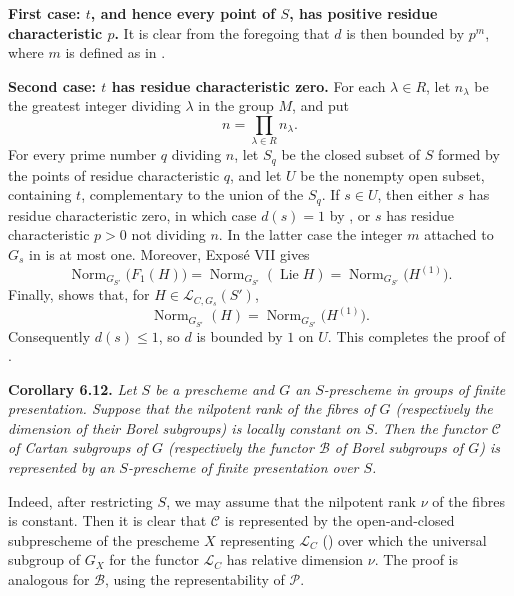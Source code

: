 \textbf{First case: \(t\), and hence every point of \(S\), has positive
residue characteristic \(p\).}
It is clear from the foregoing that \(d\) is then bounded by \(p^m\), where
\(m\) is defined as in .

\textbf{Second case: \(t\) has residue characteristic zero.}
For each \(\lambda\in R\), let \(n_\lambda\) be the greatest integer dividing
\(\lambda\) in the group \(M\), and put
\[
n=\prod_{\lambda\in R}n_\lambda.
\]
For every prime number \(q\) dividing \(n\), let \(S_q\) be the closed subset
of \(S\) formed by the points of residue characteristic \(q\), and let \(U\)
be the nonempty open subset, containing \(t\), complementary to the union of
the \(S_q\). If \(s\in U\), then either \(s\) has residue characteristic zero,
in which case \(d(s)=1\) by , or \(s\) has residue characteristic
\(p>0\) not dividing \(n\). In the latter case the integer \(m\) attached to
\(G_s\) in  is at most one. Moreover, Exposé
VII gives
\[
\operatorname{Norm}_{G_{S'}}\bigl(F_1(H)\bigr)
 =\operatorname{Norm}_{G_{S'}}(\operatorname{Lie}H)
 =\operatorname{Norm}_{G_{S'}}\bigl(H^{(1)}\bigr).
\]
Finally,  shows that, for
\(H\in\mathcal L_{C,G_s}(S')\),
\[
\operatorname{Norm}_{G_{S'}}(H)
 =\operatorname{Norm}_{G_{S'}}\bigl(H^{(1)}\bigr).
\]
Consequently \(d(s)\leq1\), so \(d\) is bounded by \(1\) on \(U\).
This completes the proof of .

\textbf{Corollary 6.12.} \emph{Let \(S\) be a prescheme and \(G\) an
\(S\)-prescheme in groups of finite presentation. Suppose that the nilpotent
rank of the fibres of \(G\) (respectively the dimension of their Borel
subgroups) is locally constant on \(S\). Then the functor \(\mathcal C\) of
Cartan subgroups of \(G\) (respectively the functor \(\mathcal B\) of Borel
subgroups of \(G\)) is represented by an \(S\)-prescheme of finite
presentation over \(S\).}

Indeed, after restricting \(S\), we may assume that the nilpotent rank
\(\nu\) of the fibres is constant. Then it is clear that \(\mathcal C\) is represented by the
open-and-closed subprescheme of the prescheme \(X\) representing
\(\mathcal L_C\) () over which the universal subgroup of \(G_X\) for the
functor \(\mathcal L_C\) has relative dimension \(\nu\). The proof is
analogous for \(\mathcal B\), using the representability of \(\mathcal P\).
